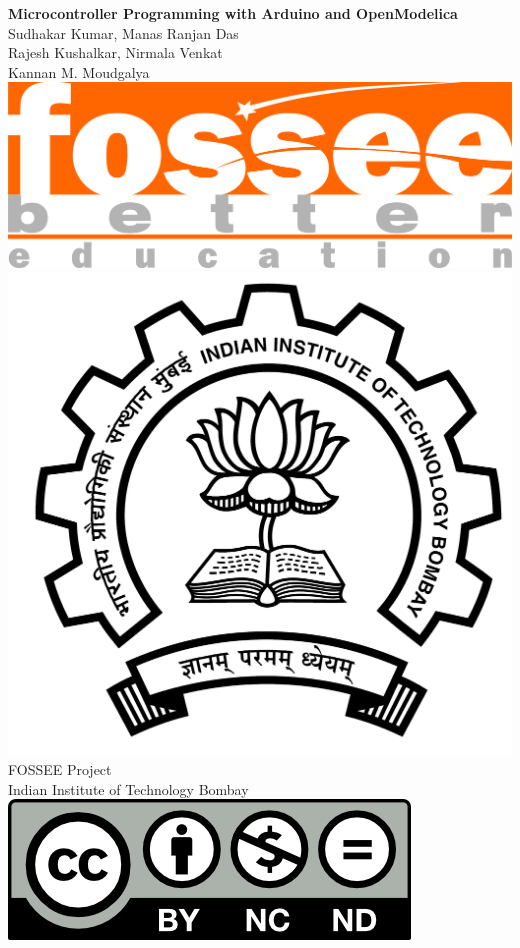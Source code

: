 \begin{center}
    {\bf {\Huge Microcontroller Programming with Arduino and OpenModelica}}
    \vfill
    Sudhakar Kumar, Manas Ranjan Das \\
    Rajesh Kushalkar, Nirmala Venkat \\
    Kannan M. Moudgalya \\
    \vfill
    \includegraphics[width=0.3\linewidth]{suppl/fossee_logo_hi.png} \quad
    \includegraphics[width=0.2\linewidth]{suppl/IITB-logo-HighRes.png} \\
    FOSSEE Project \\
    Indian Institute of Technology Bombay \\ [2mm]
    \includegraphics[width=0.15\linewidth]{suppl/by-nc-nd.png}
\end{center}

\clearpage
